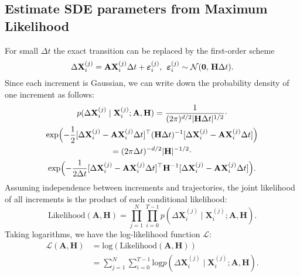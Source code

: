 \documentclass[conference]{IEEEtran}
\begin{document}
\subsection{Estimate SDE parameters from Maximum Likelihood}
For small $\Delta t$ the exact transition can be replaced by the first-order scheme
\begin{equation}\label{Euler_discretization}
    \Delta \mathbf{X}_i^{(j)} = \mathbf{AX}_i^{(j)}\Delta t + \boldsymbol{\varepsilon}_i^{(j)}, \hspace{0.15cm}
    \boldsymbol{\varepsilon}_i^{(j)} \sim \mathcal{N}(\mathbf{0}, \hspace{0.05cm} \mathbf{H}\Delta t).
\end{equation}
Since each increment is Gaussian, we can write down the probability density of one increment as follows:
\begin{multline}\label{prob_density}
    p(\Delta \mathbf{X}_i^{(j)} \mid \mathbf{X}_i^{(j)};\mathbf{A}, \mathbf{H})
        = \frac{1}{(2\pi)^{d/2}|\mathbf{H}\Delta t|^{1/2}} \cdot\\
        \text{exp}\Bigl(-\frac{1}{2}[\Delta \mathbf{X}_i^{(j)} - \mathbf{A}\mathbf{X}_i^{(j)}\Delta t]^\top(\mathbf{H}\Delta t)^{-1}[\Delta\mathbf{X}_i^{(j)} - \mathbf{A}\mathbf{X}_i^{(j)}\Delta t]\Bigr) \\
        = (2\pi\Delta t)^{-d/2}|\mathbf{H}|^{-1/2} \cdot \\
        \text{exp}\Bigl(-\frac{1}{2\Delta t}[\Delta \mathbf{X}_i^{(j)} - \mathbf{A}\mathbf{X}_i^{(j)}\Delta t]^\top\mathbf{H}^{-1}[\Delta\mathbf{X}_i^{(j)} - \mathbf{A}\mathbf{X}_i^{(j)}\Delta t]\Bigr).
\end{multline}
Assuming independence between increments and trajectories, the joint likelihood of all increments is the
product of each conditional likelihood:
\[
    \text{Likelihood}(\mathbf{A}, \mathbf{H}) = \prod_{j=1}^{N} \prod_{i=0}^{T-1}p(\Delta \mathbf{X}_i^{(j)} \mid \mathbf{X}_i^{(j)};\mathbf{A}, \mathbf{H}).
\]
Taking logarithms, we have the log-likelihood function $\mathcal{L}$:
\begin{equation}
\begin{aligned}
    \mathcal{L}(\mathbf{A}, \mathbf{H}) &= \text{log}(\text{Likelihood}(\mathbf{A}, \mathbf{H})) \\
    &= \sum_{j=1}^{N} \sum_{i=0}^{T-1} \text{log}p(\Delta \mathbf{X}_i^{(j)} \mid \mathbf{X}_i^{(j)};\mathbf{A}, \mathbf{H}).
\end{aligned}\label{log_likelihood}
\end{equation}
\end{document}
